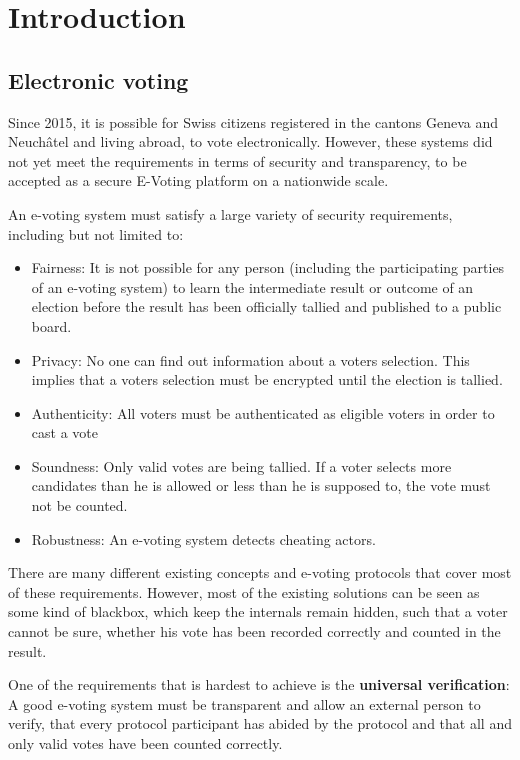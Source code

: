 \chapter{Introduction}
\section{Electronic voting}
Since 2015, it is possible for Swiss citizens registered in the cantons Geneva and Neuchâtel and living abroad, to vote electronically. However, these systems did not yet meet the requirements in terms of security and transparency, to be accepted as a secure E-Voting platform on a nationwide scale.

An e-voting system must satisfy a large variety of security requirements, including but not limited to:

\begin{itemize}
	\item Fairness: It is not possible for any person (including the participating parties of an e-voting system) to learn the intermediate result or outcome of an election before the result has been officially tallied and published to a public board.  
	\item Privacy: No one can find out information about a voters selection. This implies that a voters selection must be encrypted until the election is tallied.
	\item Authenticity: All voters must be authenticated as eligible voters in order to cast a vote
	\item Soundness: Only valid votes are being tallied. If a voter selects more candidates than he is allowed or less than he is supposed to, the vote must not be counted.
 \item Robustness: An e-voting system detects cheating actors.
\end{itemize}

There are many different existing concepts and e-voting protocols that cover most of these requirements. However, most of the existing solutions can be seen as some kind of blackbox, which keep the internals remain hidden, such that a voter cannot be sure, whether his vote has been recorded correctly and counted in the result. 

One of the requirements that is hardest to achieve is the \textbf{universal verification}: A good e-voting system must be transparent and allow an external person to verify, that every protocol participant has abided by the protocol and that all and only valid votes have been counted correctly.

